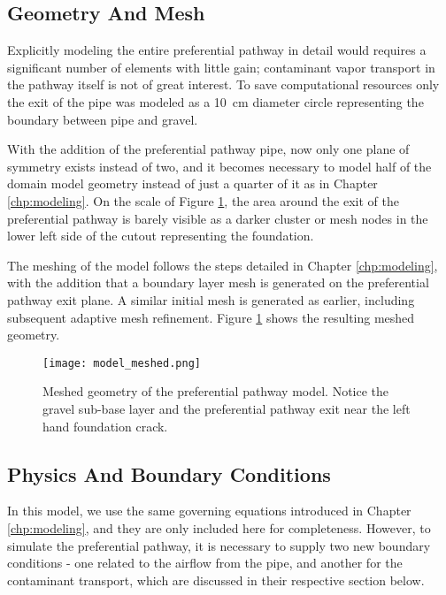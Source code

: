\subsection{Geometry And Mesh}

Explicitly modeling the entire preferential pathway in detail would requires a significant number of elements with little gain; contaminant vapor transport in the pathway itself is not of great interest.
To save computational resources only the exit of the pipe was modeled as a \SI{10}{\centi\metre} diameter circle representing the boundary between pipe and gravel.\par

With the addition of the preferential pathway pipe, now only one plane of symmetry exists instead of two, and it becomes necessary to model half of the domain model geometry instead of just a quarter of it as in Chapter \ref{chp:modeling}.
On the scale of Figure \ref{fig:model_meshed}, the area around the exit of the preferential pathway is barely visible as a darker cluster or mesh nodes in the lower left side of the cutout representing the foundation.\par

The meshing of the model follows the steps detailed in Chapter \ref{chp:modeling}, with the addition that a boundary layer mesh is generated on the preferential pathway exit plane.
A similar initial mesh is generated as earlier, including subsequent adaptive mesh refinement.
Figure \ref{fig:model_meshed} shows the resulting meshed geometry.\par

\begin{figure}[htb!]
  \centering
  \texttt{[image: model\_meshed.png]}
  \caption{Meshed geometry of the preferential pathway model. Notice the gravel sub-base layer and the preferential pathway exit near the left hand foundation crack.}
  \label{fig:model_meshed}
\end{figure}

\subsection{Physics And Boundary Conditions}

In this model, we use the same governing equations introduced in Chapter \ref{chp:modeling}, and they are only included here for completeness.
However, to simulate the preferential pathway, it is necessary to supply two new boundary conditions  - one related to the airflow from the pipe, and another for the contaminant transport, which are discussed in their respective section below.

